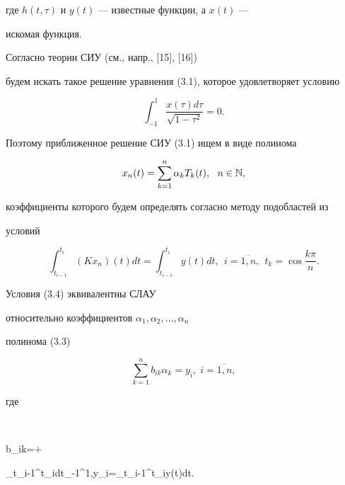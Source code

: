 где $h(t,\tau)$ и $y(t)$ --- известные функции, а $x(t)$ ---


искомая функция.





Согласно теории СИУ (см., напр., [15], [16])


будем искать такое решение уравнения (3.1), которое удовлетворяет условию


\begin{equation}


\int_{-1}^{1}\frac{x(\tau)d\tau}{\sqrt{1-\tau^2}}=0.


\end{equation}


Поэтому приближенное решение СИУ (3.1) ищем в виде полинома


\begin{equation}


x_n(t)=\sum_{k=1}^{n}\alpha_kT_k(t),\ \ n \in \Bbb N,


\end{equation}


коэффициенты которого будем определять согласно методу подобластей из


условий


\begin{equation}


\int_{t_{i-1}}^{t_i}(Kx_n)(t)dt=\int_{t_{i-1}}^{t_i}y(t)dt,\ \


i=\overline{1,n},\ \ t_k = \cos \frac{k\pi}{n}.


\end{equation}





Условия (3.4) эквивалентны СЛАУ


относительно коэффициентов $\alpha_1,\alpha_2,\dotsc,\alpha_n$


полинома (3.3)


\begin{equation}


\sum_{k=1}^{n}b_{ik}\alpha_k=y_i,\; i=\overline{1,n},


\end{equation}


где


$$


b_{ik}=+


\int_{t_{i-1}}^{t_i}dt\int_{-1}^{1},\quad y_i=\int_{t_{i-1}}^{t_i}y(t)dt.


